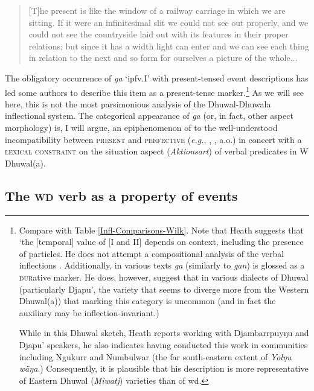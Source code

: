 \begin{quote}\small
	[T]he present is like the window of a railway carriage in which we are sitting. If it were an infinitesimal slit we could not see out properly, and we could not see the countryside laid out with its features in their proper relations; but since it has a width light can enter and we can see each thing in relation to the next and so form for ourselves a picture of the whole...\hfill{\citep[325]{Hamblin1972}}
\end{quote}



\noindent The obligatory occurrence of \textit{ga} `\gls{ipfv}.\gls{I}' with present-tensed event descriptions has led some authors \citep[\textit{e.g.},][46]{Heath1980} to describe this item as a present-tense marker.\footnote{Compare with Table \ref{Infl-Comparisons-Wilk}. Note that Heath suggests that `the [temporal] value of [\gls{I} and \gls{II}] depends on context, including the presence of particles. He does not attempt a compositional analysis of the verbal inflections \citeyearpar[38,46]{Heath1980}. Additionally, in various texts \textit{ga} (similarly to \textit{gan}) is glossed as a \textsc{dur}ative marker. He does, however, suggest that in various dialects of Dhuwal (particularly Djapu', the variety that seems to diverge more from the Western Dhuwal(a)) that marking this category is uncommon (and in fact the auxiliary may be inflection-invariant.)
	
	While in this Dhuwal sketch, Heath reports working with Djambarrpuyŋu and Djapu' speakers, he also indicates having conducted this work in communities including Ngukurr and Numbulwar (the far south-eastern extent of \textit{Yolŋu wäŋa}.) Consequently, it is plausible that his description is more representative of Eastern Dhuwal (\textit{Miwatj}) varieties than of \gls{wd}.} As we will see here, this is not the most parsimonious analysis of the Dhuwal-Dhuwala inflectional system. The categorical appearance of \textit{ga} (or, in fact, other aspect morphology) is, I will argue, an epiphenomenon of to the well-understood incompatibility between \textsc{present} and \textsc{perfective} (\textit{e.g.}, \citealp[66\textit{ff}]{Comrie1976}, \citealp[110]{Smith1997}, \citealp{Malchukov2009,Schaden2011,DeWit2016} a.o.) in concert with a \textsc{lexical constraint} on the situation aspect (\textit{Aktionsart}) of verbal predicates in W Dhuwal(a).

\subsection{The \textsc{wd} verb as a property of events}

